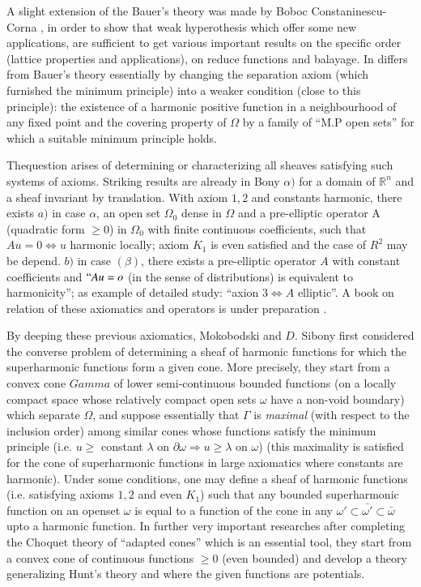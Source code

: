 A slight extension of the Bauer's theory was made by Boboc
Consta\-ninescu-Corna \cite{8}, \cite{9} in order to show that weak hyperothesis
which offer some new applications, are sufficient to get various
important results on the specific order (lattice properties and
applications), on reduce functions and balayage. In differs from
Bauer's theory essentially by changing  the separation axiom (which
furnished the minimum principle) into a weaker condition (close to this
principle): the existence of a harmonic positive function in a
neighbourhood of any fixed point and the covering property of $\Omega$
by a family of ``M.P open sets'' for which a suitable minimum
principle holds. 

The\pageoriginale question arises of determining or characterizing all sheaves
satisfying such systems of axioms. Striking results are already in
Bony \cite{14} $\alpha)$ for a domain of $\mathbb{R}^n$ and a sheaf
invariant by translation. With axiom $1,2$ and constants harmonic,
there exists $a)$ in case $\alpha$, an open set $\Omega _0$ dense in
$\Omega$ and a pre-elliptic operator A (quadratic form $\geq 0$) in
$\Omega_0$ with finite continuous coefficients, such that $A u=0
\Leftrightarrow u$ harmonic locally; axiom $K_1$ is even satisfied and
the case of $R^2$ may be depend. $b)$ in case $(\beta)$, there exists
a pre-elliptic operator $A$ with constant coefficients and $``Au=o$
(in the sense of distributions) is equivalent to harmonicity''; as
example of detailed study: ``axion $3 \Leftrightarrow A$ elliptic''. A
book on relation of these axiomatics and operators is under
preparation \cite{13}. 

By deeping these previous axiomatics, Mokobodski and $D$. Sibony
\cite{61} first considered the converse problem of determining a sheaf of
harmonic functions for which the superharmonic functions form a given
cone. More precisely, they start from a convex cone $Gamma$ of
lower semi-continuous bounded functions (on a locally compact space
whose relatively compact open sets $\omega$ have a non-void boundary)
which separate $\Omega$, and suppose essentially that $\Gamma$ is
\textit{maximal} (with respect to the inclusion order) among similar
cones whose functions satisfy the minimum principle (i.e. $u \geq$
constant $\lambda$ on $\partial \omega \Rightarrow  u \geq \lambda
\text{ on } \omega$) (this maximality is satisfied for the cone of
superharmonic functions in large axiomatics where constants are
harmonic). Under some conditions, one may define a sheaf of harmonic
functions (i.e. satisfying axioms $1,2$ and even $K_1$) such that any
bounded superharmonic function on an open\pageoriginale set $\omega$ is equal to a
function of the cone in any $\omega '\subset \bar{\omega '} \subset
\bar{\omega}$ upto a harmonic function. In further very important
researches \cite{62} after completing the Choquet theory of ``adapted
cones'' which is an essential tool,  they start from a convex cone of
continuous functions $\geq 0$ (even bounded) and develop a theory
generalizing Hunt's theory and where the given functions are
potentials. 

